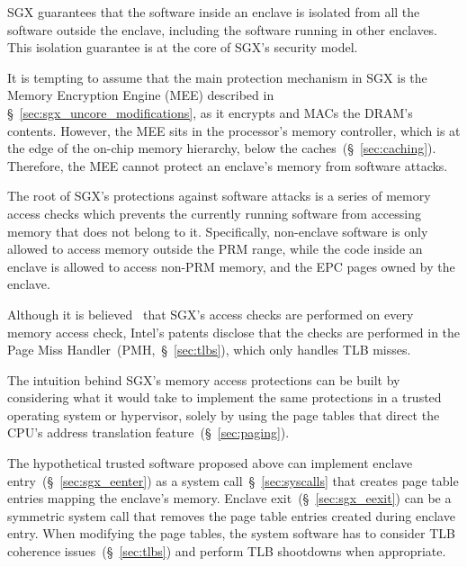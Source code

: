 \label{sec:sgx_access_protection}

SGX guarantees that the software inside an enclave is isolated from all the
software outside the enclave, including the software running in other enclaves.
This isolation guarantee is at the core of SGX's security model.

It is tempting to assume that the main protection mechanism in SGX is the
Memory Encryption Engine (MEE) described in
\S~\ref{sec:sgx_uncore_modifications}, as it encrypts and MACs the DRAM's
contents. However, the MEE sits in the processor's memory controller, which is
at the edge of the on-chip memory hierarchy, below the
caches~(\S~\ref{sec:caching}). Therefore, the MEE cannot protect an enclave's
memory from software attacks.


The root of SGX's protections against software attacks is a series of memory
access checks which prevents the currently running software from accessing
memory that does not belong to it. Specifically, non-enclave software is only
allowed to access memory outside the PRM range, while the code inside an
enclave is allowed to access non-PRM memory, and the EPC pages owned by the
enclave.


Although it is believed~\cite{evtyushkin2014isox} that SGX's access checks are
performed on every memory access check, Intel's patents disclose that the
checks are performed in the Page Miss Handler~(PMH,~\S~\ref{sec:tlbs}), which
only handles TLB misses.


\label{sec:sgx_access_concepts}

The intuition behind SGX's memory access protections can be built by
considering what it would take to implement the same protections in a trusted
operating system or hypervisor, solely by using the page tables that direct the
CPU's address translation feature~(\S~\ref{sec:paging}).

The hypothetical trusted software proposed above can implement enclave
entry~(\S~\ref{sec:sgx_eenter}) as a system call~\S~\ref{sec:syscalls} that
creates page table entries mapping the enclave's memory. Enclave
exit~(\S~\ref{sec:sgx_eexit}) can be a symmetric system call that removes the
page table entries created during enclave entry.  When modifying the page
tables, the system software has to consider TLB coherence
issues~(\S~\ref{sec:tlbs}) and perform TLB shootdowns when appropriate.

